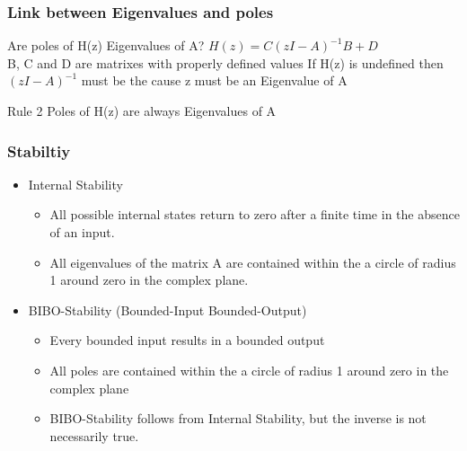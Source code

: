 \begin{frame}
	\frametitle{Link between Eigenvalues and poles}
	Are poles of H(z) Eigenvalues of A?
	$H(z) = C(zI-A)^{-1}B + D$ \\
	B, C and D are matrixes with properly defined values
	If H(z) is undefined then $(zI-A)^{-1}$ must be the cause
	z must be an Eigenvalue of A
	\begin{block}{Rule 2}
		Poles of H(z) are always Eigenvalues of A 
	\end{block}
\end{frame}
\begin{frame}
	\frametitle{Stabiltiy}
	\begin{itemize}
		\item Internal Stability
		\begin{itemize}
			\item All possible internal states return to zero after a finite time in the absence of an input.
			\item 	All eigenvalues of the matrix A are contained within the a circle of radius 1 around zero in the complex plane.
		\end{itemize}
		\item BIBO-Stability (Bounded-Input Bounded-Output)
		\begin{itemize}
			\item Every bounded input results in a bounded output
			\item All poles are contained within the a circle of radius 1 around zero in the complex plane
			\item BIBO-Stability follows from Internal Stability, but the inverse is not necessarily true.
		\end{itemize}
	\end{itemize}
\end{frame}
